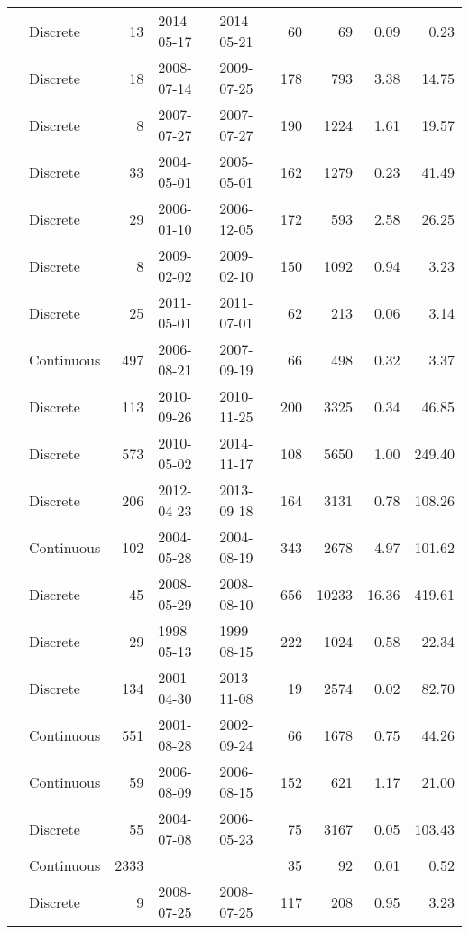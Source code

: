 \begin{longtable}{llrllrrrr}
  \citet{Gonnelli2016} & Discrete &  13 & 2014-05-17 & 2014-05-21 & 60 & 69 & 0.09 & 0.23 \\ 
  \citet{Griffin2011} & Discrete &  18 & 2008-07-14 & 2009-07-25 & 178 & 793 & 3.38 & 14.75 \\ 
  \citet{Gueguen2011} & Discrete &   8 & 2007-07-27 & 2007-07-27 & 190 & 1224 & 1.61 & 19.57 \\ 
  \citet{Helms2008} & Discrete &  33 & 2004-05-01 & 2005-05-01 & 162 & 1279 & 0.23 & 41.49 \\ 
  \citet{Hernes2008} & Discrete &  29 & 2006-01-10 & 2006-12-05 & 172 & 593 & 2.58 & 26.25 \\ 
  \citet{Hong2012} & Discrete &   8 & 2009-02-02 & 2009-02-10 & 150 & 1092 & 0.94 & 3.23 \\ 
  \citet{Hur2014} & Discrete &  25 & 2011-05-01 & 2011-07-01 & 62 & 213 & 0.06 & 3.14 \\ 
  \citet{kattegat} & Continuous & 497 & 2006-08-21 & 2007-09-19 & 66 & 498 & 0.32 & 3.37 \\ 
  \citet{Kellerman2015} & Discrete & 113 & 2010-09-26 & 2010-11-25 & 200 & 3325 & 0.34 & 46.85 \\ 
  \citet{Lambert2015a} & Discrete & 573 & 2010-05-02 & 2014-11-17 & 108 & 5650 & 1.00 & 249.40 \\ 
  \citet{Loken2016} & Discrete & 206 & 2012-04-23 & 2013-09-18 & 164 & 3131 & 0.78 & 108.26 \\ 
  \citet{lter2004} & Continuous & 102 & 2004-05-28 & 2004-08-19 & 343 & 2678 & 4.97 & 101.62 \\ 
  \citet{lter2008} & Discrete &  45 & 2008-05-29 & 2008-08-10 & 656 & 10233 & 16.36 & 419.61 \\ 
  \citet{lter5653} & Discrete &  29 & 1998-05-13 & 1999-08-15 & 222 & 1024 & 0.58 & 22.34 \\ 
  \citet{lter5689} & Discrete & 134 & 2001-04-30 & 2013-11-08 & 19 & 2574 & 0.02 & 82.70 \\ 
  \citet{Markager2011} & Continuous & 551 & 2001-08-28 & 2002-09-24 & 66 & 1678 & 0.75 & 44.26 \\ 
  \citet{Massicotte2011EA} & Continuous &  59 & 2006-08-09 & 2006-08-15 & 152 & 621 & 1.17 & 21.00 \\ 
  \citet{Moran2006} & Discrete &  55 & 2004-07-08 & 2006-05-23 & 75 & 3167 & 0.05 & 103.43 \\ 
  \citet{Nelson2002, Nelson2007, Nelson2010} & Continuous & 2333 &  &  & 35 & 92 & 0.01 & 0.52 \\ 
  \citet{Nguyen2010} & Discrete &   9 & 2008-07-25 & 2008-07-25 & 117 & 208 & 0.95 & 3.23 \\ 

\end{longtable}

